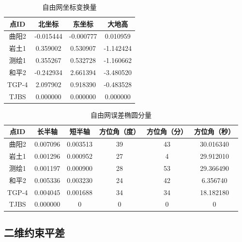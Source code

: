 \documentclass[a4paper,16pt,UTF8]{article}
\begin{document}
\begin{center}
    \begin{longtable}{|c|c|c|c|}
    \caption{自由网坐标变换量} \\ \hline
    点ID   & 北坐标   & 东坐标   & 大地高 \\ \hline
    曲阳2   & -0.015444  & -0.000777  & 0.010959  \\ \hline
    岩土1   & 0.359002  & 0.530907  & -1.142424  \\ \hline
    测绘1   & 0.355267  & 0.532728  & -1.160662  \\ \hline
    和平2   & -0.242934  & 2.661394  & -3.480520  \\ \hline
    TGP-4 & 2.097902  & 0.918390  & -0.483528  \\ \hline
    TJBS  & 0.000000  & 0.000000  & 0.000000  \\ \hline  
    \end{longtable}

    \begin{longtable}{|c|c|c|c|c|c|}
        \caption{自由网误差椭圆分量} \\ \hline
        点ID   & 长半轴   & 短半轴   & 方位角（度） & 方位角（分） & 方位角（秒） \\ \hline
        曲阳2   & 0.007096  & 0.003513  & 39    & 43    & 30.016340  \\ \hline
        岩土1   & 0.001296  & 0.000952  & 27    & 4     & 29.912010  \\ \hline
        测绘1   & 0.001197  & 0.000900  & 28    & 53    & 29.366490  \\ \hline
        和平2   & 0.005336  & 0.003230  & 24    & 42    & 6.356740  \\ \hline
        TGP-4 & 0.004045  & 0.001688  & 34    & 34    & 18.182180  \\ \hline
        TJBS  & 0.000000  & 0     & 0     & 0     & 0 \\ \hline
        \end{longtable}
\end{center}



\subsection{\Large 二维约束平差}
\end{document}
